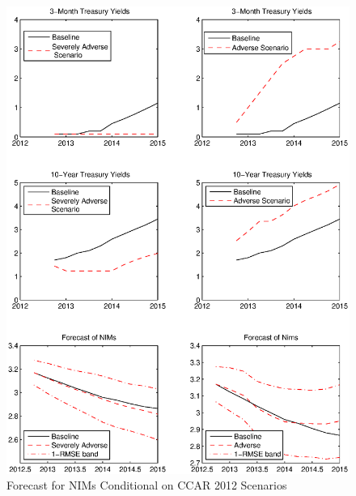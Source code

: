 \documentclass[11pt]{article}
\begin{document}
\clearpage
\begin{figure}
\flushleft
\caption{Forecast for NIMs Conditional on CCAR 2012 Scenarios} \label{figure_scenario}

 \includegraphics[scale=0.85]{figure_scenario.ps}
\end{figure}
\end{document}
